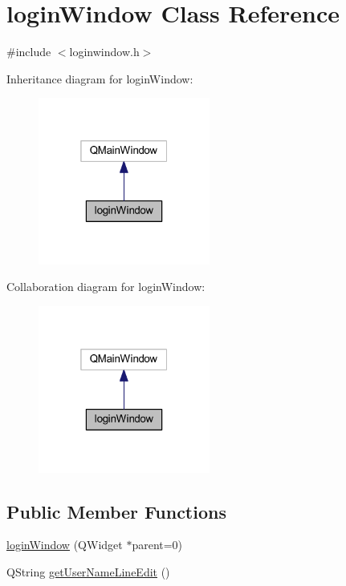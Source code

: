 \hypertarget{classlogin_window}{}\section{login\+Window Class Reference}
\label{classlogin_window}


{\ttfamily \#include $<$loginwindow.\+h$>$}



Inheritance diagram for login\+Window\+:\nopagebreak
\begin{figure}[H]
\begin{center}
\leavevmode
\includegraphics[width=160pt]{classlogin_window__inherit__graph}
\end{center}
\end{figure}


Collaboration diagram for login\+Window\+:\nopagebreak
\begin{figure}[H]
\begin{center}
\leavevmode
\includegraphics[width=160pt]{classlogin_window__coll__graph}
\end{center}
\end{figure}
\subsection*{Public Member Functions}
\begin{DoxyCompactItemize}
\item 
\hyperlink{classlogin_window_ad6f2de3f9d45e1f951a2eb2eeed9747e}{login\+Window} (Q\+Widget $\ast$parent=0)
\item 
Q\+String \hyperlink{classlogin_window_ae0670d5971676277b8d093e0396b4cb1}{get\+User\+Name\+Line\+Edit} ()
\end{DoxyCompactItemize}


